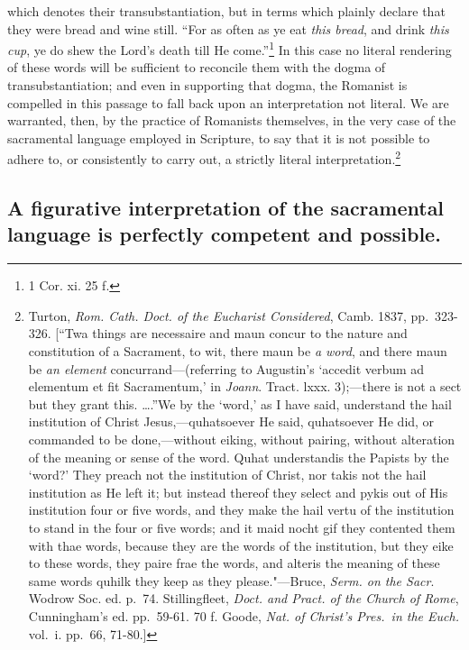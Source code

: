 \documentclass[english,]{book}
\begin{document}
which denotes their transubstantiation, but in terms which plainly declare that they were bread and wine still. ``For as often as ye eat \emph{this bread}, and drink \emph{this cup}, ye do shew the Lord's death till He come.''\footnote{1 Cor. xi. 25 f.} In this case no literal rendering of these words will be sufficient to reconcile them with the dogma of transubstantiation; and even in supporting that dogma, the Romanist is compelled in this passage to fall back upon an interpretation not literal. We are warranted, then, by the practice of Romanists themselves, in the very case of the sacramental language employed in Scripture, to say that it is not possible to adhere to, or consistently to carry out, a strictly literal interpretation.\footnote{Turton, \emph{Rom. Cath. Doct. of the Eucharist Considered}, Camb. 1837, pp.~323-326. {[}``Twa things are necessaire and maun concur to the nature and constitution of a Sacrament, to wit, there maun be \emph{a word}, and there maun be \emph{an element} concurrand---(referring to Augustin's `accedit verbum ad elementum et fit Sacramentum,' in \emph{Joann}. Tract. lxxx. 3);---there is not a sect but they grant this. \ldots{}.''We by the `word,' as I have said, understand the hail institution of Christ Jesus,---quhatsoever He said, quhatsoever He did, or commanded to be done,---without eiking, without pairing, without alteration of the meaning or sense of the word. Quhat understandis the Papists by the `word?' They preach not the institution of Christ, nor takis not the hail institution as He left it; but instead thereof they select and pykis out of His institution four or five words, and they make the hail vertu of the institution to stand in the four or five words; and it maid nocht gif they contented them with thae words, because they are the words of the institution, but they eike to these words, they paire frae the words, and alteris the meaning of these same words quhilk they keep as they please."---Bruce, \emph{Serm. on the Sacr}. Wodrow Soc. ed. p.~74. Stillingfleet, \emph{Doct. and Pract. of the Church of Rome}, Cunningham's ed. pp.~59-61. 70 f. Goode, \emph{Nat. of Christ's Pres.~in the Euch.} vol.~i. pp.~66, 71-80.{]}}

\hypertarget{a-figurative-interpretation-of-the-sacramental-language-is-perfectly-competent-and-possible.}{%
\subsection{A figurative interpretation of the sacramental language is perfectly competent and possible.}\label{a-figurative-interpretation-of-the-sacramental-language-is-perfectly-competent-and-possible.}}
\end{document}
